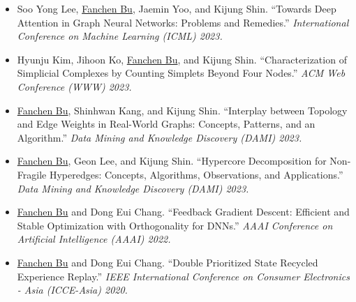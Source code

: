 \documentclass{resume}
\begin{document}
\begin{itemize}[parsep=0.5ex]
  \item [{[C4]}]
  Soo Yong Lee, \underline{Fanchen Bu}, Jaemin Yoo, and Kijung Shin.
  ``Towards Deep Attention in Graph Neural Networks: Problems and Remedies.''
  \textit{International Conference on Machine Learning (ICML) 2023.}
  
  \item [{[C3]}]
  Hyunju Kim, Jihoon Ko, \underline{Fanchen Bu}, and Kijung Shin.
  ``Characterization of Simplicial Complexes by Counting Simplets Beyond Four Nodes.''
  \textit{ACM Web Conference (WWW) 2023.}
  
  \item [{[J2]}]
  \underline{Fanchen Bu}, Shinhwan Kang, and Kijung Shin.
  ``Interplay between Topology and Edge Weights in Real-World Graphs: Concepts, Patterns, and an Algorithm.''
  \textit{Data Mining and Knowledge Discovery (DAMI) 2023.}
  
  \item [{[J1]}]
  \underline{Fanchen Bu}, Geon Lee, and Kijung Shin.
  ``Hypercore Decomposition for Non-Fragile Hyperedges: Concepts, Algorithms, Observations, and Applications.''
  \textit{Data Mining and Knowledge Discovery (DAMI) 2023.}    

  \item [{[C2]}]
  \underline{Fanchen Bu} and Dong Eui Chang.
  ``Feedback Gradient Descent: Efficient and Stable Optimization with Orthogonality for DNNs.''
  \textit{AAAI Conference on Artificial Intelligence (AAAI) 2022.}

  \item [{[C1]}]
  \underline{Fanchen Bu} and Dong Eui Chang.
  ``Double Prioritized State Recycled Experience Replay.''
  \textit{IEEE International Conference on Consumer Electronics - Asia (ICCE-Asia) 2020.} 
\end{itemize}
\end{document}
